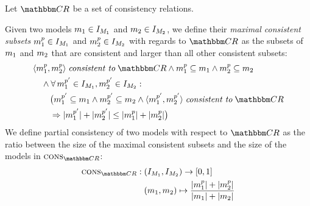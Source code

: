 \begin{definition} \label{def:partialconsistency}
    Let $\consistencyrelationset{CR}$ be a set of consistency relations.

    Given two models $m_{1} \in I_{M_{1}}$ and $m_{2} \in I_{M_{2}}$, we define their \emph{maximal consistent subsets} $m_{1}^p \in I_{M_{1}}$ and $m_{2}^p \in I_{M_{2}}$ with regards to $\consistencyrelationset{CR}$ as the subsets of $m_{1}$ and $m_{2}$ that are consistent and larger than all other consistent subsets:
    \begin{align*}
        & 
        \tupled{\model{m}{1}^p, \model{m}{2}^p} \consistenttomath \consistencyrelationset{CR} \land
        \model{m}{1}^p \subseteq \model{m}{1} \land \model{m}{2}^p \subseteq \model{m}{2}  \\
        & \formulaskip
        \land \forall \model{m}{1}^{p'} \in \metamodelinstanceset{M}{1}, \model{m}{2}^{p'} \in \metamodelinstanceset{M}{2} : \\
        & \formulaskip\formulaskip
        \bigl(\model{m}{1}^{p'} \subseteq \model{m}{1} \land \model{m}{2}^{p'} \subseteq \model{m}{2} 
        \land \tupled{\model{m}{1}^{p'}, \model{m}{2}^{p'}} \consistenttomath \consistencyrelationset{CR} \\
        & \formulaskip\formulaskip
        \Rightarrow 
        \abs{\model{m}{1}^{p'}} + \abs{\model{m}{2}^{p'}} \leq \abs{\model{m}{1}^{p}} + \abs{\model{m}{2}^{p}} \bigr)
    \end{align*}
    We define partial consistency of two models with respect to $\consistencyrelationset{CR}$ as the ratio between the size of the maximal consistent subsets and the size of the models in $\function{cons}_{\consistencyrelationset{CR}}$:
    \begin{align*}
        \function{cons}_{\consistencyrelationset{CR}}: \; 
        & (\metamodelinstanceset{M}{1}, \metamodelinstanceset{M}{2}) \rightarrow [0,1] \\
        & 
        (\model{m}{1}, \model{m}{2}) \mapsto \frac{\abs{\model{m}{1}^{p}} + \abs{\model{m}{2}^{p}}}{\abs{\model{m}{1}} + \abs{\model{m}{2}}}
    \end{align*}

\end{definition}
